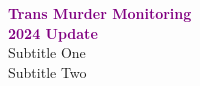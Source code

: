 \documentclass[12pt]{article} %
\newcommand{\PurpleText}[1]{\textcolor{purple}{\textbf{#1}}}
\begin{document}
\thispagestyle{firstpage}
\centering
\vspace*{3cm}
{\Huge \PurpleText{Trans Murder Monitoring \\ 2024 Update}}\\[1cm]
{\Large Subtitle One}\\[0.5cm]
{\Large Subtitle Two}\\[2cm]

\newpage
\lipsum[4-20] %
\end{document}
